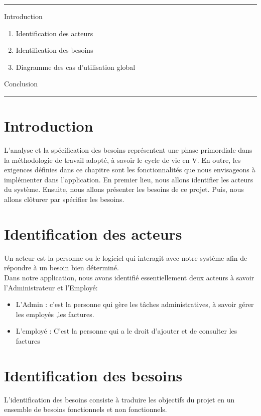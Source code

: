 \documentclass[12pt]{report}
\begin{document}
\hrule
\vspace{20pt}
Introduction
\begin{enumerate}
	\item Identification des acteurs
	\item Identification des besoins
	\item Diagramme des cas d'utilisation global
\end{enumerate}

Conclusion
\vspace{20pt}
\hrule
\newpage

\section*{Introduction}
L'analyse et la spécification des besoins représentent une phase primordiale dans la méthodologie de travail adopté, à savoir le cycle de vie en V. En outre, les exigences définies dans ce chapitre sont les fonctionnalités que nous envisageons à implémenter dans l'application. En premier lieu, nous allons identifier les acteurs du système. Ensuite, nous allons présenter les besoins de ce projet. Puis, nous allons clôturer par spécifier les besoins.

\section{Identification des acteurs}
Un acteur est la personne ou le logiciel qui interagit avec notre système afin de répondre à un besoin bien déterminé.\\
Dans notre application, nous avons identifié essentiellement deux acteurs à savoir l'Administrateur et l'Employé:

\begin{itemize}[label={$\bullet$}]
	\item L'Admin : c'est la personne qui gère les tâches administratives, à savoir gérer les employés ,les factures.
	\item L'employé : C'est la personne qui a le droit d'ajouter et de consulter les factures
\end{itemize}
\section{Identification des besoins}
L'identification des besoins consiste à traduire les objectifs du projet en un ensemble de besoins fonctionnels et non fonctionnels. 
\end{document}
